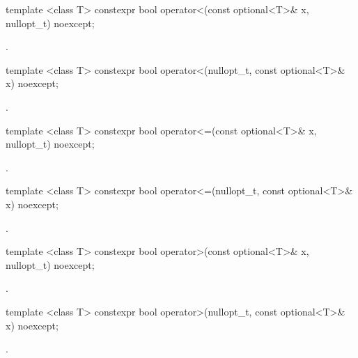 %
\begin{itemdecl}
template <class T> constexpr bool operator<(const optional<T>& x, nullopt_t) noexcept;
\end{itemdecl}

\begin{itemdescr}
\pnum
\returns
{}.
\end{itemdescr}

\begin{itemdecl}
template <class T> constexpr bool operator<(nullopt_t, const optional<T>& x) noexcept;
\end{itemdecl}

\begin{itemdescr}
\pnum
\returns
{}.
\end{itemdescr}

%
\begin{itemdecl}
template <class T> constexpr bool operator<=(const optional<T>& x, nullopt_t) noexcept;
\end{itemdecl}

\begin{itemdescr}
\pnum
\returns
{}.
\end{itemdescr}

\begin{itemdecl}
template <class T> constexpr bool operator<=(nullopt_t, const optional<T>& x) noexcept;
\end{itemdecl}

\begin{itemdescr}
\pnum
\returns
{}.
\end{itemdescr}

%
\begin{itemdecl}
template <class T> constexpr bool operator>(const optional<T>& x, nullopt_t) noexcept;
\end{itemdecl}

\begin{itemdescr}
\pnum
\returns
{}.
\end{itemdescr}

\begin{itemdecl}
template <class T> constexpr bool operator>(nullopt_t, const optional<T>& x) noexcept;
\end{itemdecl}

\begin{itemdescr}
\pnum
\returns
{}.
\end{itemdescr}


